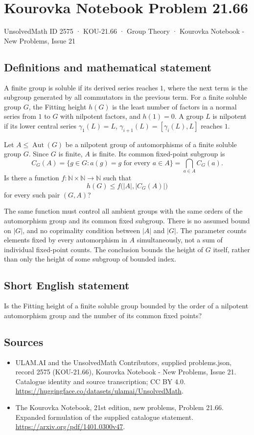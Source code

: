 \documentclass[11pt,a4paper]{article}
\begin{document}
\section*{Kourovka Notebook Problem 21.66}\label{2575}
{\small UnsolvedMath ID 2575 · KOU-21.66 · Group Theory · Kourovka Notebook - New Problems, Issue 21}
\subsection{Definitions and mathematical statement}
A finite group is soluble if its derived series reaches $1$, where
the next term is the subgroup generated by all commutators in the
previous term. For a finite soluble group $G$, the Fitting height
$h(G)$ is the least number of factors in a normal series from $1$
to $G$ with nilpotent factors, and $h(1)=0$.
A group $L$ is nilpotent if its lower central series
$\gamma_1(L)=L$, $\gamma_{i+1}(L)=[\gamma_i(L),L]$ reaches $1$.

Let $A\le\operatorname{Aut}(G)$ be a nilpotent group of automorphisms
of a finite soluble group $G$. Since $G$ is finite, $A$ is finite.
Its common fixed-point subgroup is
\[
 C_G(A)=\{g\in G:a(g)=g\text{ for every }a\in A\}
        =\bigcap_{a\in A}C_G(a).
\]
Is there a function $f:\mathbb N\times\mathbb N\to\mathbb N$
such that
\[
 h(G)\le f\bigl(|A|,|C_G(A)|\bigr)
\]
for every such pair $(G,A)$?

The same function must control all ambient groups with the same
orders of the automorphism group and its common fixed subgroup.
There is no assumed bound on $|G|$, and no coprimality condition
between $|A|$ and $|G|$. The parameter counts elements fixed by every
automorphism in $A$ simultaneously, not a sum of individual fixed-point
counts. The conclusion bounds the height of $G$ itself, rather than
only the height of some subgroup of bounded index.
\subsection{Short English statement}
Is the Fitting height of a finite soluble group bounded by the order of a nilpotent automorphism group and the number of its common fixed points?
\subsection{Sources}
\begin{itemize}
\item[S1] ULAM.AI and the UnsolvedMath Contributors, supplied problems.json, record 2575 (KOU-21.66), Kourovka Notebook - New Problems, Issue 21. Catalogue identity and source transcription; CC BY 4.0.
\url{https://huggingface.co/datasets/ulamai/UnsolvedMath}.
\item[S2] The Kourovka Notebook, 21st edition, new problems, Problem 21.66. Expanded formulation of the supplied catalogue statement.
\url{https://arxiv.org/pdf/1401.0300v47}.
\end{itemize}
\end{document}
